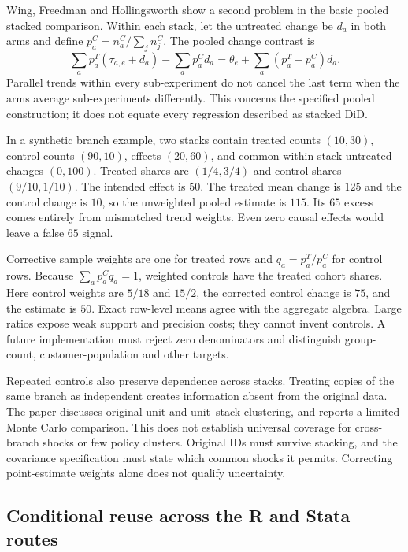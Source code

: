 Wing, Freedman and Hollingsworth show a second problem in the basic pooled stacked comparison. Within each stack, let
the untreated change be $d_a$ in both arms and define $p_a^C=n_a^C/\sum_jn_j^C$. The pooled change contrast is
\[
 \sum_a p_a^T(\tau_{a,e}+d_a)-\sum_a p_a^C d_a
 =\theta_e+\sum_a(p_a^T-p_a^C)d_a.
\]
Parallel trends within every sub-experiment do not cancel the last term when the arms average sub-experiments differently.
This concerns the specified pooled construction; it does not equate every regression described as stacked DiD.
\citep{exec28_panel_wing}

In a synthetic branch example, two stacks contain treated counts $(10,30)$, control counts $(90,10)$, effects $(20,60)$,
and common within-stack untreated changes $(0,100)$. Treated shares are $(1/4,3/4)$ and control shares $(9/10,1/10)$.
The intended effect is $50$. The treated mean change is $125$ and the control change is $10$, so the unweighted pooled
estimate is $115$. Its $65$ excess comes entirely from mismatched trend weights. Even zero causal effects would leave
a false $65$ signal.~\citep{exec28_panel_reference}

Corrective sample weights are one for treated rows and $q_a=p_a^T/p_a^C$ for control rows. Because
$\sum_a p_a^Cq_a=1$, weighted controls have the treated cohort shares. Here control weights are $5/18$ and $15/2$,
the corrected control change is $75$, and the estimate is $50$. Exact row-level means agree with the aggregate algebra.
Large ratios expose weak support and precision costs; they cannot invent controls. A future implementation must reject
zero denominators and distinguish group-count, customer-population and other targets.~\citep{exec28_panel_wing,exec28_panel_reference}

Repeated controls also preserve dependence across stacks. Treating copies of the same branch as independent creates
information absent from the original data. The paper discusses original-unit and unit--stack clustering, and reports a
limited Monte Carlo comparison. This does not establish universal coverage for cross-branch shocks or few policy clusters.
Original IDs must survive stacking, and the covariance specification must state which common shocks it permits.
Correcting point-estimate weights alone does not qualify uncertainty.~\citep{exec28_panel_wing}

\subsection{Conditional reuse across the R and Stata routes}

